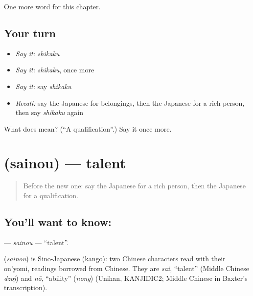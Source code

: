 \begin{grammarlens}[title={What you've built}]
One more word for this chapter.
\end{grammarlens}

\subsection*{Your turn}
\begin{itemize}
\raggedright
  \item \emph{Say it:} \emph{shikaku}
  \item \emph{Say it:} \emph{shikaku}, once more
  \item \emph{Say it:} say \emph{shikaku}
  \item \emph{Recall:} say the Japanese for belongings, then the Japanese for a rich person, then say \emph{shikaku} again
\end{itemize}

\begin{tcolorbox}[breakable,colback=teal!4,colframe=teal!35!black,title={Before you move on}]
What does  mean? (\textquotedblleft{}A qualification\textquotedblright{}.) Say it once more.
\end{tcolorbox}
\section[\texorpdfstring{\ja{さいのう} (sainou)}{さいのう (sainou)}]{ (sainou) — talent}

\label{lesson:JA-C96-sainou}



\begin{quote}
Before the new one: say the Japanese for a rich person, then the Japanese for a qualification.
\end{quote}

\subsection*{You'll want to know: }
\textbf{} — \emph{sainou} — \textquotedblleft{}talent\textquotedblright{}.

\begin{cousinweb}
\textbf{} (\emph{sainou}) is Sino-Japanese (kango): two Chinese characters read with their on'yomi, readings borrowed from Chinese. They are \emph{sai}, \textquotedblleft{}talent\textquotedblright{} (Middle Chinese \emph{dzoj}) and \emph{nō}, \textquotedblleft{}ability\textquotedblright{} (\emph{nong}) (Unihan, KANJIDIC2; Middle Chinese in Baxter's transcription).
\end{cousinweb}

